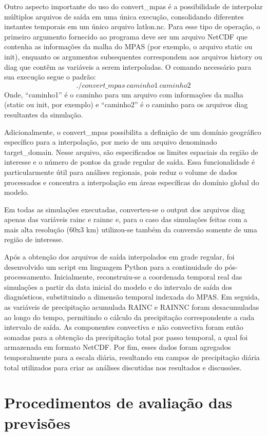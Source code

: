 \documentclass[12pt,a4paper,oneside]{book}
\begin{document}
Outro aspecto importante do uso do convert\_mpas é a possibilidade de interpolar múltiplos arquivos de saída em uma única execução, consolidando diferentes instantes temporais em um único arquivo latlon.nc. Para esse tipo de operação, o primeiro argumento fornecido ao programa deve ser um arquivo NetCDF que contenha as informações da malha do MPAS (por exemplo, o arquivo static ou init), enquanto os argumentos subsequentes correspondem aos arquivos history ou diag que contêm as variáveis a serem interpoladas. O comando necessário para sua execução segue o padrão:
\[
./convert\_mpas\ caminho1\ caminho2
\]
Onde, ``caminho1'' é o caminho para um arquivo com informações da malha (static ou init, por exemplo) e ``caminho2'' é o caminho para os arquivos diag resultantes da simulação.

Adicionalmente, o convert\_mpas possibilita a definição de um domínio geográfico específico para a interpolação, por meio de um arquivo denominado target\_domain. Nesse arquivo, são especificados os limites espaciais da região de interesse e o número de pontos da grade regular de saída. Essa funcionalidade é particularmente útil para análises regionais, pois reduz o volume de dados processados e concentra a interpolação em áreas específicas do domínio global do modelo.

Em todas as simulações executadas, converteu-se o output dos arquivos diag apenas das variáveis rainc e rainnc e, para o caso das simulações feitas com a mais alta resolução (60x3 km) utilizou-se também da conversão somente de uma região de interesse.

Após a obtenção dos arquivos de saída interpolados em grade regular, foi desenvolvido um script em linguagem Python para a continuidade do pós-processamento. Inicialmente, reconstruiu-se a coordenada temporal real das simulações a partir da data inicial do modelo e do intervalo de saída dos diagnósticos, substituindo a dimensão temporal indexada do MPAS. Em seguida, as variáveis de precipitação acumulada RAINC e RAINNC foram desacumuladas ao longo do tempo, permitindo o cálculo da precipitação correspondente a cada intervalo de saída. As componentes convectiva e não convectiva foram então somadas para a obtenção da precipitação total por passo temporal, a qual foi armazenada em formato NetCDF. Por fim, esses dados foram agregados temporalmente para a escala diária, resultando em campos de precipitação diária total utilizados para criar as análises discutidas nos resultados e discussões.

\section{Procedimentos de avaliação das previsões}
\label{sec:procedimentos-avaliacao}
\end{document}
